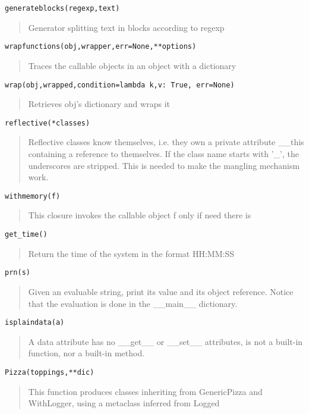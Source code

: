 \documentclass[10pt,english]{article}
\begin{document}
\texttt{generateblocks(regexp,text)}
\begin{quote}

Generator splitting text in blocks according to regexp
\end{quote}

\texttt{wrapfunctions(obj,wrapper,err=None,**options)}
\begin{quote}

Traces the callable objects in an object with a dictionary
\end{quote}

\texttt{wrap(obj,wrapped,condition=lambda k,v: True, err=None)}
\begin{quote}

Retrieves obj's dictionary and wraps it
\end{quote}

\texttt{reflective(*classes)}
\begin{quote}

Reflective classes know themselves, i.e. they own a private
attribute {\_}{\_}this containing a reference to themselves. If the class
name starts with '{\_}', the underscores are stripped. This is needed
to make the mangling mechanism work.
\end{quote}

\texttt{withmemory(f)}
\begin{quote}

This closure invokes the callable object f only if need there is
\end{quote}

\texttt{get{\_}time()}
\begin{quote}

Return the time of the system in the format HH:MM:SS
\end{quote}

\texttt{prn(s)}
\begin{quote}

Given an evaluable string, print its value and its object reference.
Notice that the evaluation is done in the {\_}{\_}main{\_}{\_} dictionary.
\end{quote}

\texttt{isplaindata(a)}
\begin{quote}

A data attribute has no {\_}{\_}get{\_}{\_} or {\_}{\_}set{\_}{\_} attributes, is not
a built-in function, nor a built-in method.
\end{quote}

\texttt{Pizza(toppings,**dic)}
\begin{quote}

This function produces classes inheriting from GenericPizza and 
WithLogger, using a metaclass inferred from Logged
\end{quote}
\end{document}
